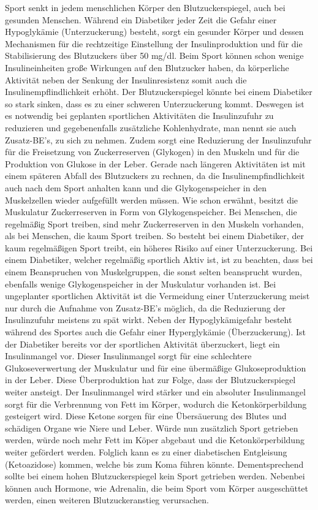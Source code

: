 \documentclass[a4paper,11pt]{article}%
\renewcommand{\\}{\vspace*{0.5\baselineskip} \newline}
\begin{document}
	Sport senkt in jedem menschlichen Körper den Blutzuckerspiegel, auch bei gesunden Menschen. Während ein Diabetiker jeder Zeit die Gefahr einer Hypoglykämie (Unterzuckerung) besteht, sorgt ein gesunder Körper und dessen Mechanismen für die rechtzeitige Einstellung der Insulinproduktion und für die Stabilisierung des Blutzuckers über 50 mg/dl.\cite{SG} Beim Sport können schon wenige Insulineinheiten große Wirkungen auf den Blutzucker haben, da körperliche Aktivität neben der Senkung der Insulinresistenz somit auch die Insulinempflindlichkeit erhöht. Der Blutzuckerspiegel könnte bei einem Diabetiker so stark sinken, dass es zu einer schweren Unterzuckerung kommt. Deswegen ist es notwendig bei geplanten sportlichen Aktivitäten die Insulinzufuhr zu reduzieren und gegebenenfalls zusätzliche Kohlenhydrate, man nennt sie auch Zusatz-BE’s, zu sich zu nehmen. Zudem sorgt eine Reduzierung der Insulinzufuhr für die Freisetzung von Zuckerreserven (Glykogen) in den Muskeln und für die Produktion von Glukose in der Leber. Gerade nach längeren Aktivitäten ist mit einem späteren Abfall des Blutzuckers zu rechnen, da die Insulinempfindlichkeit auch nach dem Sport anhalten kann und die Glykogenspeicher in den Muskelzellen wieder aufgefüllt werden müssen.\cite{RP}\newline
	Wie schon erwähnt, besitzt die Muskulatur Zuckerreserven in Form von Glykogenspeicher. Bei Menschen, die regelmäßig Sport treiben, sind mehr Zuckerreserven in den Muskeln vorhanden, als bei Menschen, die kaum Sport treiben. So besteht bei einem Diabetiker, der kaum regelmäßigen Sport treibt, ein höheres Risiko auf einer Unterzuckerung. Bei einem Diabetiker, welcher regelmäßig sportlich Aktiv ist, ist zu beachten, dass bei einem Beanspruchen von Muskelgruppen, die sonst selten beansprucht wurden, ebenfalls wenige Glykogenspeicher in der Muskulatur vorhanden ist.\newline
	Bei ungeplanter sportlichen Aktivität ist die Vermeidung einer Unterzuckerung meist nur durch die Aufnahme von Zusatz-BE’s möglich, da die Reduzierung der Insulinzufuhr meistens zu spät wirkt.\newline
	Neben der Hypoglykämigefahr besteht während des Sportes auch die Gefahr einer Hyperglykämie (Überzuckerung). Ist der Diabetiker bereits vor der sportlichen Aktivität überzuckert, liegt ein Insulinmangel vor. Dieser Insulinmangel sorgt für eine schlechtere Glukoseverwertung der Muskulatur und für eine übermäßige Glukoseproduktion in der Leber. Diese Überproduktion hat zur Folge, dass der Blutzuckerspiegel weiter ansteigt. Der Insulinmangel wird stärker und ein absoluter Insulinmangel sorgt für die Verbrennung von Fett im Körper, wodurch die Ketonkörperbildung gesteigert wird. Diese Ketone sorgen für eine Übersäuerung des Blutes und schädigen Organe wie Niere und Leber. Würde nun zusätzlich Sport getrieben werden, würde noch mehr Fett im Köper abgebaut und die Ketonkörperbildung weiter gefördert werden. Folglich kann es zu einer diabetischen Entgleisung (Ketoazidose) kommen, welche bis zum Koma führen könnte. Dementsprechend sollte bei einem hohen Blutzuckerspiegel kein Sport getrieben werden. Nebenbei können auch Hormone, wie Adrenalin, die beim Sport vom Körper ausgeschüttet werden, einen weiteren Blutzuckeranstieg verursachen. \newline
\end{document}
